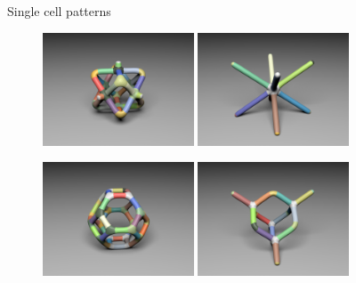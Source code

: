 \begin{frame}{Single cell patterns}
\begin{figure}
\hspace{\fill}
\includegraphics[width=0.4\textwidth]{Images/brick5_cell_source.png}
\hspace{\fill}
\includegraphics[width=0.4\textwidth]{Images/star_cell_source.png}
\hspace{\fill}

\vspace{3mm}
\hspace{\fill}
\includegraphics[width=0.4\textwidth]{Images/truncated_octahedron_cell_source.png}
\hspace{\fill}
\includegraphics[width=0.4\textwidth]{Images/diamond_cell_source.png}
\hspace{\fill}
\end{figure}
\end{frame}

